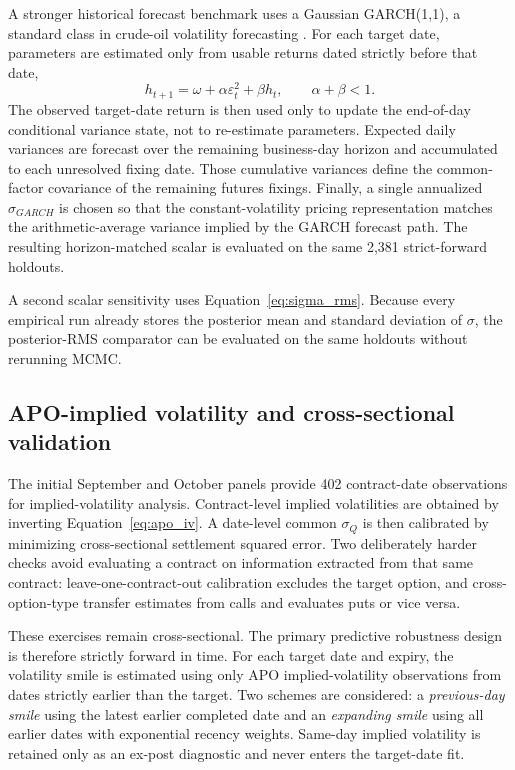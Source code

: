 A stronger historical forecast benchmark uses a Gaussian GARCH(1,1), a standard class in crude-oil volatility forecasting \cite{gildertsiaras2020}. For each target date, parameters are estimated only from usable returns dated strictly before that date,
\begin{equation}
 h_{t+1}=\omega+\alpha\varepsilon_t^2+\beta h_t,
 \qquad \alpha+\beta<1.
 \label{eq:garch11}
\end{equation}
The observed target-date return is then used only to update the end-of-day conditional variance state, not to re-estimate parameters. Expected daily variances are forecast over the remaining business-day horizon and accumulated to each unresolved fixing date. Those cumulative variances define the common-factor covariance of the remaining futures fixings. Finally, a single annualized $\sigma_{GARCH}$ is chosen so that the constant-volatility pricing representation matches the arithmetic-average variance implied by the GARCH forecast path. The resulting horizon-matched scalar is evaluated on the same 2,381 strict-forward holdouts.

A second scalar sensitivity uses Equation~\eqref{eq:sigma_rms}. Because every empirical run already stores the posterior mean and standard deviation of $\sigma$, the posterior-RMS comparator can be evaluated on the same holdouts without rerunning MCMC.

\subsection{APO-implied volatility and cross-sectional validation}

The initial September and October panels provide 402 contract-date observations for implied-volatility analysis. Contract-level implied volatilities are obtained by inverting Equation~\eqref{eq:apo_iv}. A date-level common $\sigma_Q$ is then calibrated by minimizing cross-sectional settlement squared error. Two deliberately harder checks avoid evaluating a contract on information extracted from that same contract: leave-one-contract-out calibration excludes the target option, and cross-option-type transfer estimates from calls and evaluates puts or vice versa.

These exercises remain cross-sectional. The primary predictive robustness design is therefore strictly forward in time. For each target date and expiry, the volatility smile is estimated using only APO implied-volatility observations from dates strictly earlier than the target. Two schemes are considered: a \emph{previous-day smile} using the latest earlier completed date and an \emph{expanding smile} using all earlier dates with exponential recency weights. Same-day implied volatility is retained only as an ex-post diagnostic and never enters the target-date fit.

